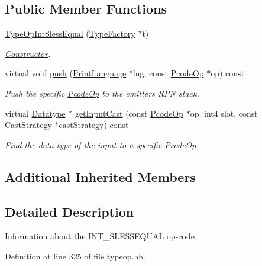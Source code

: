 \subsection*{Public Member Functions}
\begin{DoxyCompactItemize}
\item 
\mbox{\hyperlink{class_type_op_int_sless_equal_ac3b860546e9d1f39f1ab63dd328eb625}{Type\+Op\+Int\+Sless\+Equal}} (\mbox{\hyperlink{class_type_factory}{Type\+Factory}} $\ast$t)
\begin{DoxyCompactList}\small\item\em \mbox{\hyperlink{class_constructor}{Constructor}}. \end{DoxyCompactList}\item 
virtual void \mbox{\hyperlink{class_type_op_int_sless_equal_a066d484600af10fdbd00a5f114982332}{push}} (\mbox{\hyperlink{class_print_language}{Print\+Language}} $\ast$lng, const \mbox{\hyperlink{class_pcode_op}{Pcode\+Op}} $\ast$op) const
\begin{DoxyCompactList}\small\item\em Push the specific \mbox{\hyperlink{class_pcode_op}{Pcode\+Op}} to the emitter\textquotesingle{}s R\+PN stack. \end{DoxyCompactList}\item 
virtual \mbox{\hyperlink{class_datatype}{Datatype}} $\ast$ \mbox{\hyperlink{class_type_op_int_sless_equal_a3451ebb5f373aac736a788d7c6878cb6}{get\+Input\+Cast}} (const \mbox{\hyperlink{class_pcode_op}{Pcode\+Op}} $\ast$op, int4 slot, const \mbox{\hyperlink{class_cast_strategy}{Cast\+Strategy}} $\ast$cast\+Strategy) const
\begin{DoxyCompactList}\small\item\em Find the data-\/type of the input to a specific \mbox{\hyperlink{class_pcode_op}{Pcode\+Op}}. \end{DoxyCompactList}\end{DoxyCompactItemize}
\subsection*{Additional Inherited Members}


\subsection{Detailed Description}
Information about the I\+N\+T\+\_\+\+S\+L\+E\+S\+S\+E\+Q\+U\+AL op-\/code. 

Definition at line 325 of file typeop.\+hh.



